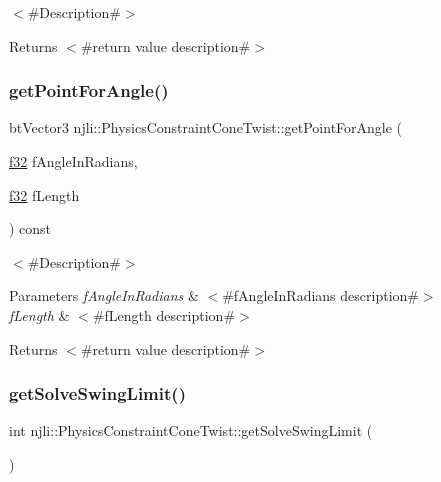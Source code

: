 $<$\#\+Description\#$>$

\begin{DoxyReturn}{Returns}
$<$\#return value description\#$>$ 
\end{DoxyReturn}
\mbox{\label{classnjli_1_1_physics_constraint_cone_twist_a3df16444695d8a3d406a7efe742106fb}} 
\subsubsection{\texorpdfstring{get\+Point\+For\+Angle()}{getPointForAngle()}}
{\footnotesize\ttfamily bt\+Vector3 njli\+::\+Physics\+Constraint\+Cone\+Twist\+::get\+Point\+For\+Angle (\begin{DoxyParamCaption}\item[{\mbox{\hyperlink{_util_8h_a5f6906312a689f27d70e9d086649d3fd}{f32}}}]{f\+Angle\+In\+Radians,  }\item[{\mbox{\hyperlink{_util_8h_a5f6906312a689f27d70e9d086649d3fd}{f32}}}]{f\+Length }\end{DoxyParamCaption}) const}

$<$\#\+Description\#$>$


\begin{DoxyParams}{Parameters}
{\em f\+Angle\+In\+Radians} & $<$\#f\+Angle\+In\+Radians description\#$>$ \\
\hline
{\em f\+Length} & $<$\#f\+Length description\#$>$\\
\hline
\end{DoxyParams}
\begin{DoxyReturn}{Returns}
$<$\#return value description\#$>$ 
\end{DoxyReturn}
\mbox{\label{classnjli_1_1_physics_constraint_cone_twist_abe8033d8ead97feb20871704c0ac81a0}} 
\subsubsection{\texorpdfstring{get\+Solve\+Swing\+Limit()}{getSolveSwingLimit()}}
{\footnotesize\ttfamily int njli\+::\+Physics\+Constraint\+Cone\+Twist\+::get\+Solve\+Swing\+Limit (\begin{DoxyParamCaption}{ }\end{DoxyParamCaption})}

